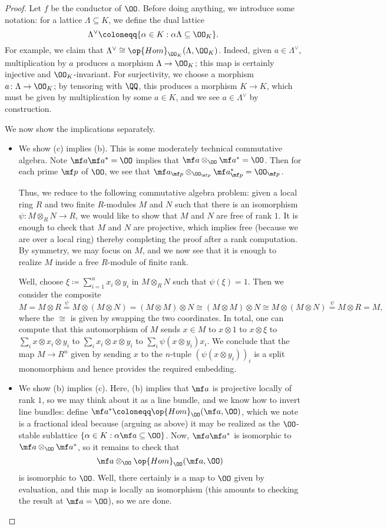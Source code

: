 \documentclass[../notes.tex]{subfiles}
\begin{document}
\begin{proof}
	Let $f$ be the conductor of $\OO$. Before doing anything, we introduce some notation: for a lattice $\Lambda\subseteq K$, we define the dual lattice
	\[\Lambda^\lor\coloneqq\{\alpha\in K:\alpha\Lambda\subseteq\OO_K\}.\]
	For example, we claim that $\Lambda^\lor\cong\op{Hom}_{\OO_K}(\Lambda,\OO_K)$. Indeed, given $a\in\Lambda^\lor$, multiplication by $a$ produces a morphism $\Lambda\to\OO_K$; this map is certainly injective and $\OO_K$-invariant. For surjectivity, we choose a morphism $a\colon\Lambda\to\OO_K$; by tensoring with $\QQ$, this produces a morphism $K\to K$, which must be given by multiplication by some $a\in K$, and we see $a\in\Lambda^\lor$ by construction.

	We now show the implications separately.
	\begin{itemize}
		\item We show (c) implies (b). This is some moderately technical commutative algebra. Note $\mf a\mf a^*=\OO$ implies that $\mf a\otimes_\OO\mf a^*=\OO$. Then for each prime $\mf p$ of $\OO$, we see that $\mf a_{\mf p}\otimes_{\OO_{\mf p}}\mf a^*_{\mf p}=\OO_{\mf p}$.
		
		Thus, we reduce to the following commutative algebra problem: given a local ring $R$ and two finite $R$-modules $M$ and $N$ such that there is an isomorphism $\psi\colon M\otimes_RN\to R$, we would like to show that $M$ and $N$ are free of rank $1$. It is enough to check that $M$ and $N$ are projective, which implies free (because we are over a local ring) thereby completing the proof after a rank computation. By symmetry, we may focus on $M$, and we now see that it is enough to realize $M$ inside a free $R$-module of finite rank.
		
		Well, choose $\xi\coloneqq\sum_{i=1}^nx_i\otimes y_i$ in $M\otimes_RN$ such that $\psi(\xi)=1$. Then we consider the composite
		\[M=M\otimes R\stackrel\psi=M\otimes(M\otimes N)=(M\otimes M)\otimes N\cong(M\otimes M)\otimes N\cong M\otimes(M\otimes N)\stackrel\psi=M\otimes R=M,\]
		where the $\cong$ is given by swapping the two coordinates. In total, one can compute that this automorphism of $M$ sends $x\in M$ to $x\otimes1$ to $x\otimes\xi$ to $\sum_i x\otimes x_i\otimes y_i$ to $\sum_ix_i\otimes x\otimes y_i$ to $\sum_i\psi(x\otimes y_i)x_i$. We conclude that the map $M\to R^n$ given by sending $x$ to the $n$-tuple $(\psi(x\otimes y_i))_i$ is a split monomorphism and hence provides the required embedding.

		\item We show (b) implies (c). Here, (b) implies that $\mf a$ is projective locally of rank $1$, so we may think about it as a line bundle, and we know how to invert line bundles: define $\mf a^*\coloneqq\op{Hom}_\OO(\mf a,\OO)$, which we note is a fractional ideal because (arguing as above) it may be realized as the $\OO$-stable sublattice $\{\alpha\in K:\alpha\mf a\subseteq\OO\}$. Now, $\mf a\mf a^*$ is isomorphic to $\mf a\otimes_\OO\mf a^*$, so it remains to check that
		\[\mf a\otimes_\OO\op{Hom}_\OO(\mf a,\OO)\]
		is isomorphic to $\OO$. Well, there certainly is a map to $\OO$ given by evaluation, and this map is locally an isomorphism (this amounts to checking the result at $\mf a=\OO$), so we are done.


\end{itemize}
\end{proof}
\end{document}
